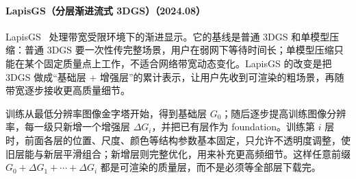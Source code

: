\paragraph{LapisGS（分层渐进流式 3DGS）（2024.08）}
LapisGS~\cite{2408_14823} 处理带宽受限环境下的渐进显示。它的基线是普通 3DGS 和单模型压缩：普通 3DGS 要一次性传完整场景，用户在弱网下等待时间长；单模型压缩只能在某个固定质量点上工作，不适合网络带宽动态变化。LapisGS 的改变是把 3DGS 做成“基础层 + 增强层”的累计表示，让用户先收到可渲染的粗场景，再随带宽逐步接收更高质量细节。

训练从最低分辨率图像金字塔开始，得到基础层 $G_0$；随后逐步提高训练图像分辨率，每一级只新增一个增强层 $\Delta G_i$，并把已有层作为 foundation。训练第 $i$ 层时，前面各层的位置、尺度、颜色等结构参数基本固定，只允许不透明度调整，使旧层能与新层平滑组合；新增层则完整优化，用来补充更高频细节。这样任意前缀 $G_0+\Delta G_1+\cdots+\Delta G_i$ 都是可渲染的质量层，而不是必须等全部层下载完。

